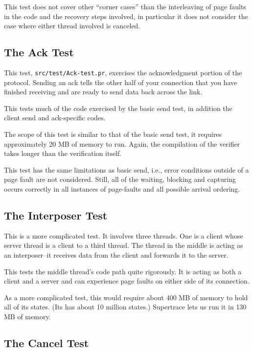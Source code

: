 This test does not cover other ``corner cases'' than the interleaving 
of page faults in the code and the recovery steps involved, in
particular it does not consider the case where either thread 
involved is canceled.

\subsection{The Ack Test}

This test, {\tt src/test/Ack-test.pr}, exercises the acknowledgment 
portion of the protocol.  Sending an ack tells the other half of your
connection that you have finished receiving and are ready to send data
back across the link.  

This tests much of the code exercised by the basic send test, in
addition the client send and ack-specific codes.

The scope of this test is similar to that of the basic send
test, it requires approximately 20 MB of memory to run. Again, the
compilation of the verifier takes longer than the verification itself.

This test has the same limitations as basic send, i.e., error 
conditions outside of a page fault are not considered.  Still, all
of the waiting, blocking and capturing occurs correctly in all
instances of page-faults and all possible arrival ordering. 

\subsection{The Interposer Test}

This is a more complicated test.  It involves three threads.  One is a
client whose server thread is a client to a third thread.   The
thread in the middle is acting as an interposer--it receives data from the
client and forwards it to the server.

This tests the middle thread's code path quite rigorously.  It is
acting as both a client and a server and can experience page faults on
either side of its connection.

As a more complicated test, this would require about 400 MB of memory
to hold all of its states.  (Its has about 10 million states.)  
Supertrace lets us run it in 130 MB of memory.

\subsection{The Cancel Test}

